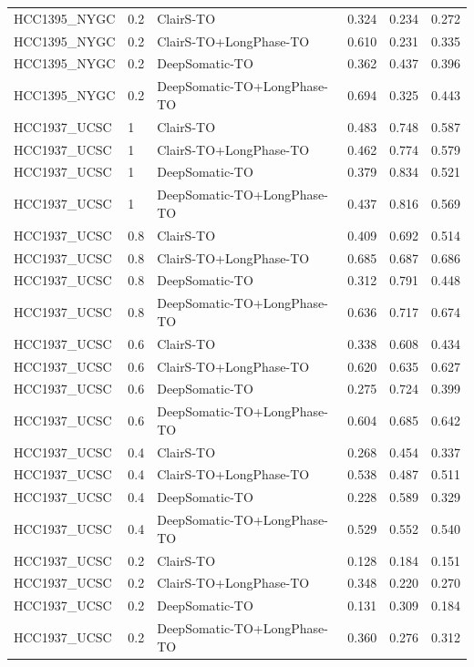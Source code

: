 \documentclass[pdflatex,sn-nature]{sn-jnl}
\begin{document}
{\begin{longtable}{@{}lllccc@{}}
  HCC1395\_NYGC & 0.2 & ClairS-TO & 0.324 & 0.234 & 0.272 \\
  HCC1395\_NYGC & 0.2 & ClairS-TO+LongPhase-TO & 0.610 & 0.231 & 0.335 \\
  HCC1395\_NYGC & 0.2 & DeepSomatic-TO & 0.362 & 0.437 & 0.396 \\
  HCC1395\_NYGC & 0.2 & DeepSomatic-TO+LongPhase-TO & 0.694 & 0.325 & 0.443 \\
  HCC1937\_UCSC & 1 & ClairS-TO & 0.483 & 0.748 & 0.587 \\
  HCC1937\_UCSC & 1 & ClairS-TO+LongPhase-TO & 0.462 & 0.774 & 0.579 \\
  HCC1937\_UCSC & 1 & DeepSomatic-TO & 0.379 & 0.834 & 0.521 \\
  HCC1937\_UCSC & 1 & DeepSomatic-TO+LongPhase-TO & 0.437 & 0.816 & 0.569 \\
  HCC1937\_UCSC & 0.8 & ClairS-TO & 0.409 & 0.692 & 0.514 \\
  HCC1937\_UCSC & 0.8 & ClairS-TO+LongPhase-TO & 0.685 & 0.687 & 0.686 \\
  HCC1937\_UCSC & 0.8 & DeepSomatic-TO & 0.312 & 0.791 & 0.448 \\
  HCC1937\_UCSC & 0.8 & DeepSomatic-TO+LongPhase-TO & 0.636 & 0.717 & 0.674 \\
  HCC1937\_UCSC & 0.6 & ClairS-TO & 0.338 & 0.608 & 0.434 \\
  HCC1937\_UCSC & 0.6 & ClairS-TO+LongPhase-TO & 0.620 & 0.635 & 0.627 \\
  HCC1937\_UCSC & 0.6 & DeepSomatic-TO & 0.275 & 0.724 & 0.399 \\
  HCC1937\_UCSC & 0.6 & DeepSomatic-TO+LongPhase-TO & 0.604 & 0.685 & 0.642 \\
  HCC1937\_UCSC & 0.4 & ClairS-TO & 0.268 & 0.454 & 0.337 \\
  HCC1937\_UCSC & 0.4 & ClairS-TO+LongPhase-TO & 0.538 & 0.487 & 0.511 \\
  HCC1937\_UCSC & 0.4 & DeepSomatic-TO & 0.228 & 0.589 & 0.329 \\
  HCC1937\_UCSC & 0.4 & DeepSomatic-TO+LongPhase-TO & 0.529 & 0.552 & 0.540 \\
  HCC1937\_UCSC & 0.2 & ClairS-TO & 0.128 & 0.184 & 0.151 \\
  HCC1937\_UCSC & 0.2 & ClairS-TO+LongPhase-TO & 0.348 & 0.220 & 0.270 \\
  HCC1937\_UCSC & 0.2 & DeepSomatic-TO & 0.131 & 0.309 & 0.184 \\
  HCC1937\_UCSC & 0.2 & DeepSomatic-TO+LongPhase-TO & 0.360 & 0.276 & 0.312 \\

\end{longtable}}
\end{document}

